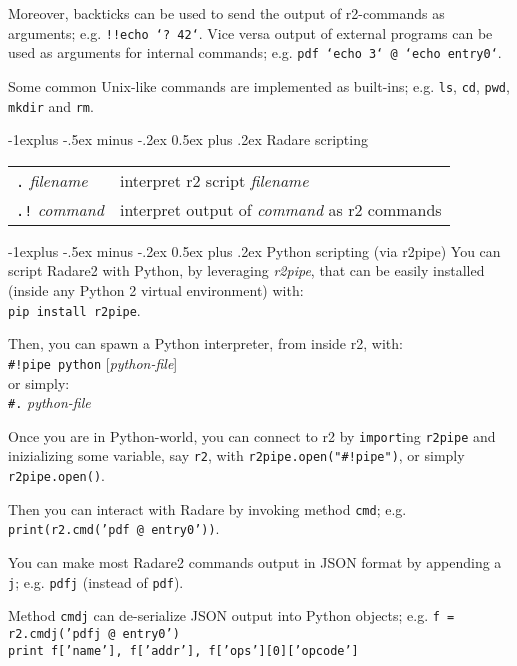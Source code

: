 \documentclass[a4paper,landscape]{article}
\makeatletter
\renewcommand{\subsection}{\@startsection{subsection}{2}{0mm}%
                                {-1explus -.5ex minus -.2ex}%
                                {0.5ex plus .2ex}%
                                {\normalfont\normalsize\bfseries}}
\makeatother
\begin{document}
\begin{multicols*}{3}
Moreover, backticks can be used to send the output of r2-commands as arguments; e.g.
\texttt{!!echo `? 42`}.
Vice versa output of external programs can be used as arguments for internal commands; e.g. \texttt{pdf `echo 3` @ `echo entry0`}.

Some common Unix-like commands are implemented as built-ins; e.g. \texttt{ls}, \texttt{cd}, \texttt{pwd}, \texttt{mkdir} and \texttt{rm}.

\subsection{Radare scripting}
\begin{tabular}{@{}ll@{}}
\texttt{.} \textit{filename} & interpret r2 script \textit{filename} \\
\texttt{.!} \textit{command} & interpret output of \textit{command} as r2 commands \\
\end{tabular}

\subsection{Python scripting (via r2pipe)}
You can script Radare2 with Python, by leveraging \emph{r2pipe}, that can be easily installed (inside any Python 2 virtual environment)
with: \\ \texttt{pip install r2pipe}.

Then, you can spawn a Python interpreter, from inside r2, with: \\
\texttt{\#!pipe python} [\textit{python-file}] \\
or simply: \\
\texttt{\#.} \textit{python-file}

Once you are in Python-world, you can connect to r2 by \texttt{import}ing \texttt{r2pipe} and inizializing some variable,
say \texttt{r2}, with \texttt{r2pipe.open("\#!pipe")}, or simply \texttt{r2pipe.open()}.

Then you can interact with Radare by invoking method \texttt{cmd}; e.g. \texttt{print(r2.cmd('pdf @ entry0'))}.

You can make most Radare2 commands output in JSON format by appending a \texttt{j}; e.g. \texttt{pdfj} (instead of \texttt{pdf}).

Method \texttt{cmdj} can de-serialize JSON output into Python objects; e.g. \texttt{f = r2.cmdj('pdfj @ entry0')} \\ \texttt{print f['name'], f['addr'], f['ops'][0]['opcode']}


\end{multicols*}
\end{document}
